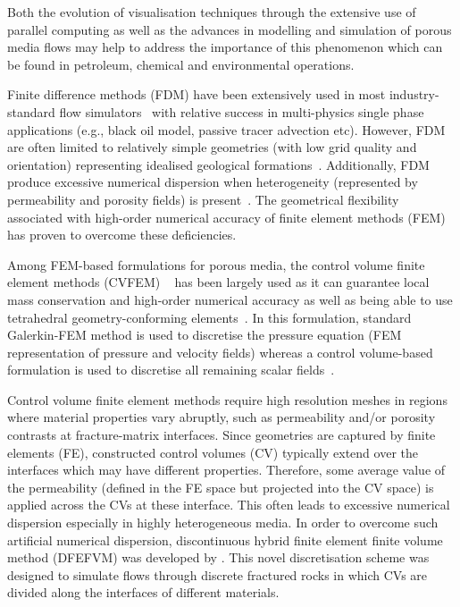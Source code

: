 \documentclass[preprint,authoryear,12pt]{elsarticle}
\begin{document}
{Both the evolution of visualisation techniques through the extensive use of parallel computing as well as the advances in modelling and simulation of porous media flows may help to address the importance of this phenomenon which can be found in petroleum, chemical and environmental operations. 

Finite difference methods (FDM) have been extensively used in most industry-standard flow simulators~\citep{aziz_1986, chen_2005, chang_1990} with relative success in multi-physics single phase applications (e.g., black oil model, passive tracer advection etc). However, FDM are often limited to relatively simple geometries (with low grid quality and orientation) representing idealised geological formations~\citep{mlacnik_2004, king_1999}. Additionally, FDM produce excessive numerical dispersion when heterogeneity (represented by permeability and porosity fields) is present~\citep{chavent_1986}. The geometrical flexibility associated with high-order numerical accuracy of finite element methods (FEM) has proven to overcome these deficiencies. 

Among FEM-based formulations for porous media, the control volume finite element methods (CVFEM) ~\citep[CVFEM,][]{fung_1992,cordazzo_2004} has been largely used as it can guarantee local mass conservation and high-order numerical accuracy as well as being able to use tetrahedral geometry-conforming elements~\citep{forsyth_1990, geiger_2004, hurtado_2007}. In this formulation, standard Galerkin-FEM method is used to discretise the pressure equation (FEM representation of pressure and velocity fields) whereas a control volume-based formulation is used to discretise all remaining scalar fields~\citep[e.g., saturation, density, species concentration etc, see][]{gomes_book_2012}. 

Control volume finite element methods require high resolution meshes in regions where material properties vary abruptly, such as permeability and/or porosity contrasts at fracture-matrix interfaces. Since geometries are captured by finite elements (FE), constructed control volumes (CV) typically extend over the interfaces which may have different properties. Therefore, some average value of the permeability (defined in the FE space but projected into the CV space) is applied across the CVs at these interface. This often leads to excessive numerical dispersion especially in highly heterogeneous media. In order to overcome such artificial numerical dispersion, discontinuous hybrid finite element finite volume method (DFEFVM) was developed by \citet{nick_2011b, nick_2011a}. This novel discretisation scheme was designed to simulate flows through discrete fractured rocks in which CVs are divided along the interfaces of different materials.  

}
\end{document}
